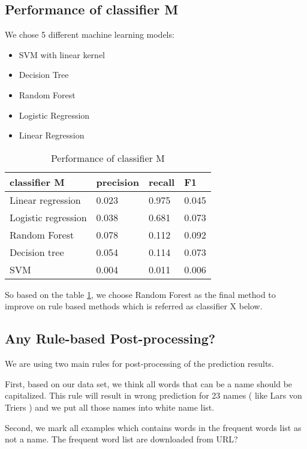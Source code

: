 \documentclass{article}
\begin{document}
\subsection{Performance of classifier M}
We chose 5 different machine learning models:

\begin{itemize}
\setlength\itemsep{0.01em}
\item SVM with linear kernel
\item Decision Tree
\item Random Forest
\item Logistic Regression
\item Linear Regression
\end{itemize}

\begin{table}[h]
\centering
\caption{Performance of classifier M}
\label{table1}
\begin{tabular}{llll}
\toprule
classifier   M    & precision & recall & F1     \\  
\midrule
Linear regression   & 0.023     & 0.975  & 0.045 \\  
Logistic regression & 0.038     & 0.681  & 0.073 \\  
Random Forest       & 0.078     & 0.112  & 0.092 \\  
Decision tree       & 0.054     & 0.114  & 0.073 \\  
SVM                 & 0.004     & 0.011  & 0.006  \\
\bottomrule
\end{tabular}
\end{table}

So based on the table \ref{table1}, we choose Random Forest as the final method to improve on rule based methods which is referred as classifier X below.

\subsection{Any Rule-based Post-processing?}

We are using two main rules for post-processing of the prediction results. 

First, based on our data set, we think all words that can be a name should be capitalized.  This rule will result in wrong prediction for 23 names ( like Lars von Triers  ) and we put all those names into white name list.

Second, we mark all examples which contains words in the frequent words list as not a name. The frequent word list are downloaded from URL?
\end{document}
